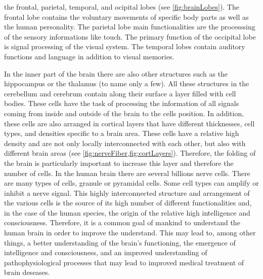 %
the frontal, parietal, temporal, and ocipital lobes (see \cref{fig:brainLobes}).
The frontal lobe contains the voluntary movements of specific body parts as well as the human personality.
The parietal lobe main functionalities are the processsing of the sensory informations like touch.
The primary function of the occipital lobe is signal processing of the visual system.
The temporal lobes contain auditory functions and language in addition to visual memories.
\par
%
In the inner part of the brain there are also other structures such as the hippocampus or the thalamus (to name only a few).
All these structures in the cerebellum and cerebrum contain along their surface a layer filled with cell bodies.
These cells have the task of processing the information of all signals coming from inside and outside of the brain to the cells position.
In addition, these cells are also arranged in cortical layers that have different thicknesses, cell types, and densities specific to a brain area.
These cells have a relative high density and are not only locally interconnected with each other, but also with different brain areas (see \cref{fig:nerveFiber,fig:cortLayers}).
Therefore, the folding of the brain is particularly important to increase this layer and therefore the number of cells.
In the human brain there are several billions nerve cells.
There are many types of cells, \eg{} granule or pyramidal cells.
Some cell types can amplify or inhibit a nerve signal.
This highly interconnected structure and arrangement of the various cells is the source of its high number of different functionalities and, in the case of the human species, the origin of the relative high intelligence and consciousness.
Therefore, it is a common goal of mankind to understand the human brain in order to improve the understand.
This may lead to, among other things, a better understanding of the brain's functioning, the emergence of intelligence and consciousness, and an improved understanding of pathophysiological processes that may lead to improved medical treatment of brain deseases.
%
%
%
